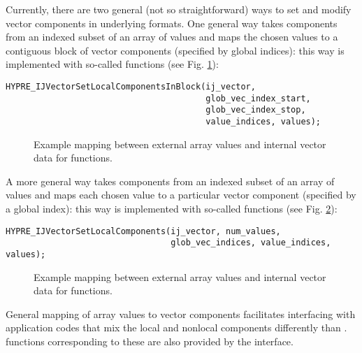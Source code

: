 Currently, there are two general (not so straightforward) ways to set and
modify vector components in underlying \hypre{} formats.  One general way
takes components from an indexed subset of an array of values and maps
the chosen values to a contiguous block of \hypre{} vector components
(specified by global \hypre{} indices):  this way is implemented with so-called
 functions (see Fig. \ref{loc-comps-blk}):

\begin{display}
\begin{verbatim}
HYPRE_IJVectorSetLocalComponentsInBlock(ij_vector,
                                        glob_vec_index_start,
                                        glob_vec_index_stop,
                                        value_indices, values);
\end{verbatim}
\end{display}

\begin{figure}
\label{loc-comps-blk}
\centerline{}
\caption{Example mapping between external array values and
  internal vector data for  functions.}
\end{figure}

A more general way takes components from an indexed subset of an array of
values and maps each chosen value to a particular \hypre{} vector component
(specified by a global \hypre{} index): this way is implemented with so-called
 functions (see Fig. \ref{loc-comps}):

\begin{display}
\begin{verbatim}
HYPRE_IJVectorSetLocalComponents(ij_vector, num_values,
                                 glob_vec_indices, value_indices, values);
\end{verbatim}
\end{display}

\begin{figure}
\label{loc-comps}
\centerline{}
\caption{Example mapping between external array values and
   internal vector data for  functions.}
\end{figure}

General mapping of array values to \hypre{} vector components
facilitates interfacing with application codes that mix
the local and nonlocal components differently than \hypre{}.
 functions corresponding to these  are also
provided by the interface.


